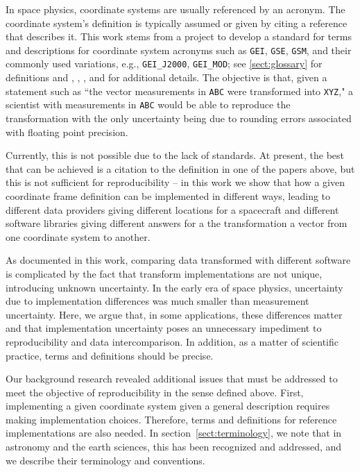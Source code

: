 \documentclass[draft]{agujournal2019}
\begin{document}

In space physics, coordinate systems are usually referenced by an acronym. The coordinate system's definition is typically assumed or given by citing a reference that describes it. This work stems from a project to develop a standard for terms and descriptions for coordinate system acronyms such as \texttt{GEI}, \texttt{GSE}, \texttt{GSM}, and their commonly used variations, e.g., \texttt{GEI\_J2000}, \texttt{GEI\_MOD}; see \ref{sect:glossary} for definitions and , , , and  for additional details. The objective is that, given a statement such as ``the vector measurements in \texttt{ABC} were transformed into \texttt{XYZ}," a scientist with measurements in \texttt{ABC} would be able to reproduce the transformation with the only uncertainty being due to rounding errors associated with floating point precision.

Currently, this is not possible due to the lack of standards. At present, the best that can be achieved is a citation to the definition in one of the papers above, but this is not sufficient for reproducibility -- in this work we show that how a given coordinate frame definition can be implemented in different ways, leading to different data providers giving different locations for a spacecraft and different software libraries giving different answers for a the transformation a vector from one coordinate system to another.

As documented in this work, comparing data transformed with different software is complicated by the fact that transform implementations are not unique, introducing unknown uncertainty. In the early era of space physics, uncertainty due to implementation differences was much smaller than measurement uncertainty. Here, we argue that, in some applications, these differences matter and that implementation uncertainty poses an unnecessary impediment to reproducibility and data intercomparison. In addition, as a matter of scientific practice, terms and definitions should be precise.

Our background research revealed additional issues that must be addressed to meet the objective of reproducibility in the sense defined above. First, implementing a given coordinate system given a general description requires making implementation choices. Therefore, terms and definitions for reference implementations are also needed. In section~\ref{sect:terminology}, we note that in astronomy and the earth sciences, this has been recognized and addressed, and we describe their terminology and conventions.
\end{document}
